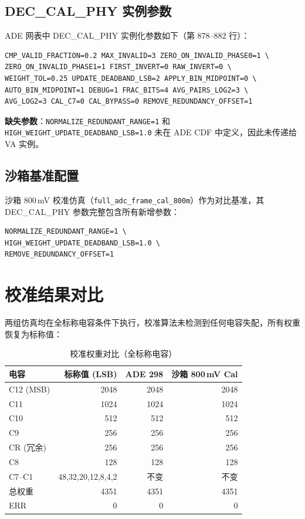 \documentclass[12pt,a4paper]{article}
\begin{document}
\subsection{DEC\_CAL\_PHY 实例参数}

ADE 网表中 DEC\_CAL\_PHY 实例化参数如下（第 878--882 行）：

\begin{lstlisting}
CMP_VALID_FRACTION=0.2 MAX_INVALID=3 ZERO_ON_INVALID_PHASE0=1 \
ZERO_ON_INVALID_PHASE1=1 FIRST_INVERT=0 RAW_INVERT=0 \
WEIGHT_TOL=0.25 UPDATE_DEADBAND_LSB=2 APPLY_BIN_MIDPOINT=0 \
AUTO_BIN_MIDPOINT=1 DEBUG=1 FRAC_BITS=4 AVG_PAIRS_LOG2=3 \
AVG_LOG2=3 CAL_C7=0 CAL_BYPASS=0 REMOVE_REDUNDANCY_OFFSET=1
\end{lstlisting}

\textbf{缺失参数}：\texttt{NORMALIZE\_REDUNDANT\_RANGE=1} 和 \texttt{HIGH\_WEIGHT\_UPDATE\_DEADBAND\_LSB=1.0} 未在 ADE CDF 中定义，因此未传递给 VA 实例。

\subsection{沙箱基准配置}

沙箱 800\,mV 校准仿真（\texttt{full\_adc\_frame\_cal\_800m}）作为对比基准，其 DEC\_CAL\_PHY 参数完整包含所有新增参数：

\begin{lstlisting}
NORMALIZE_REDUNDANT_RANGE=1 \
HIGH_WEIGHT_UPDATE_DEADBAND_LSB=1.0 \
REMOVE_REDUNDANCY_OFFSET=1
\end{lstlisting}

\section{校准结果对比}

两组仿真均在全标称电容条件下执行，校准算法未检测到任何电容失配，所有权重恢复为标称值：

\begin{table}[H]
\centering
\caption{校准权重对比（全标称电容）}
\label{tab:weights}
\begin{tabular}{lrrr}
\toprule
电容 & 标称值 (LSB) & ADE 298 & 沙箱 800\,mV Cal \\
\midrule
C12 (MSB) & 2048 & 2048 & 2048 \\
C11 & 1024 & 1024 & 1024 \\
C10 & 512 & 512 & 512 \\
C9 & 256 & 256 & 256 \\
CR (冗余) & 256 & 256 & 256 \\
C8 & 128 & 128 & 128 \\
C7--C1 & 48,32,20,12,8,4,2 & 不变 & 不变 \\
\midrule
总权重 & 4351 & 4351 & 4351 \\
ERR & 0 & 0 & 0 \\
\bottomrule
\end{tabular}
\end{table}
\end{document}
